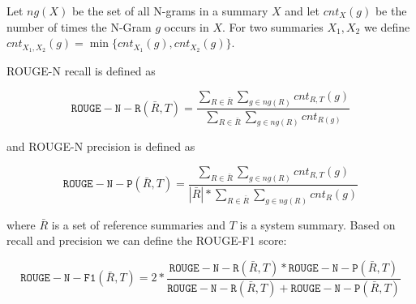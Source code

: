 \documentclass[a4paper,BCOR=10mm]{report}
\numberwithin{lemma}{chapter}
\numberwithin{definition}{chapter}
\begin{document}
Let $\mathit{ng}(X)$ be the set of all N-grams in a summary $X$ and let $\mathit{cnt}_{X}(g)$ be the number of times the N-Gram $g$ occurs in $X$.
For two summaries $X_1, X_2$ we define $\mathit{cnt}_{X_1, X_2}(g) = \min\{  \mathit{cnt}_{X_1}(g),  \mathit{cnt}_{X_2}(g) \}$.

ROUGE-N recall is defined as

\begin{equation}
    \mathtt{ROUGE-N-R}(\bar{R}, T) =  \frac{
        \sum_{R \in \bar{R}}
        \sum_{g \in \mathit{ng}(R)}
        \mathit{cnt}_{R,T}(g)
    } {
        \sum_{R \in \bar{R}}
        \sum_{g \in \mathit{ng}(R)}
        \mathit{cnt}_{R(g)}
    }
\end{equation}

and ROUGE-N precision is defined as

\begin{equation}
    \mathtt{ROUGE-N-P}(\bar{R}, T) =  \frac{\sum_{R \in \bar{R}} \sum_{g \in \mathit{ng}(R)} \mathit{cnt}_{R,T}(g)}{|\bar{R}| * \sum_{R \in \bar{R}} \sum_{g \in \mathit{ng}(R)} \mathit{cnt}_{R}(g)}
\end{equation}

where $\bar{R}$ is a set of reference summaries and $T$ is a system summary.
Based on recall and precision we can define the ROUGE-F1 score:

\begin{equation}
    \mathtt{ROUGE-N-F1}(\bar{R}, T) = 2 * \frac{\mathtt{ROUGE-N-R}(\bar{R}, T) * \mathtt{ROUGE-N-P}(\bar{R}, T)}{\mathtt{ROUGE-N-R}(\bar{R}, T) + \mathtt{ROUGE-N-P}(\bar{R}, T)}
\end{equation}
\end{document}
